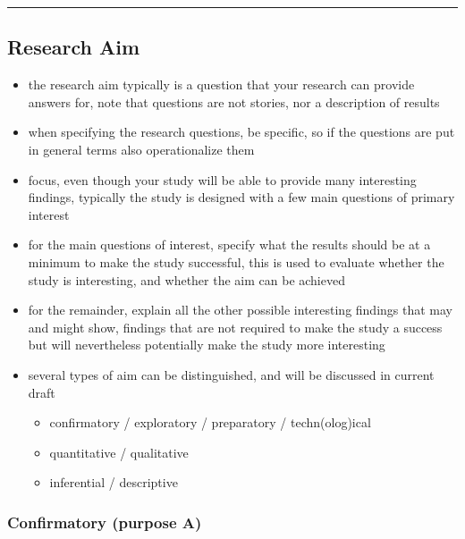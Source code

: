 \documentclass[]{article}
\providecommand{\tightlist}{%
  \setlength{\itemsep}{0pt}\setlength{\parskip}{0pt}}
\begin{document}
\begin{center}\rule{0.5\linewidth}{\linethickness}\end{center}

\subsection{Research Aim}\label{research-aim}

\begin{itemize}
\tightlist
\item
  the research aim typically is a question that your research can
  provide answers for, note that questions are not stories, nor a
  description of results
\item
  when specifying the research questions, be specific, so if the
  questions are put in general terms also operationalize them
\item
  focus, even though your study will be able to provide many interesting
  findings, typically the study is designed with a few main questions of
  primary interest
\item
  for the main questions of interest, specify what the results should be
  at a minimum to make the study successful, this is used to evaluate
  whether the study is interesting, and whether the aim can be achieved
\item
  for the remainder, explain all the other possible interesting findings
  that may and might show, findings that are not required to make the
  study a success but will nevertheless potentially make the study more
  interesting 
\item
  several types of aim can be distinguished, and will be discussed in
  current draft

  \begin{itemize}
  \tightlist
  \item
    confirmatory / exploratory / preparatory / techn(olog)ical
  \item
    quantitative / qualitative
  \item
    inferential / descriptive
  \end{itemize}
\end{itemize}

\subsubsection{Confirmatory (purpose A)}\label{confirmatory-purpose-a}
\end{document}
